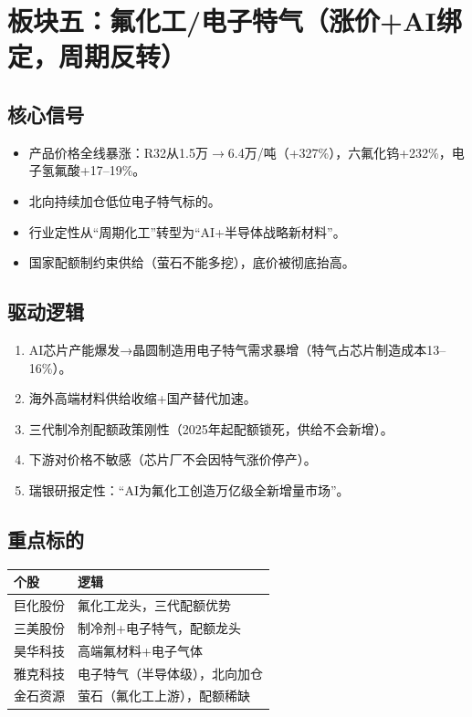 \documentclass[a4paper,11pt,fontset=none]{ctexart}
\begin{document}
\section{板块五：氟化工/电子特气（涨价+AI绑定，周期反转）}

\subsection*{核心信号}
\begin{itemize}
  \item 产品价格全线暴涨：R32从1.5万$\to$6.4万/吨（+327\%），六氟化钨+232\%，电子氢氟酸+17--19\%。
  \item 北向持续加仓低位电子特气标的。
  \item 行业定性从``周期化工''转型为``AI+半导体战略新材料''。
  \item 国家配额制约束供给（萤石不能多挖），底价被彻底抬高。
\end{itemize}

\subsection*{驱动逻辑}
\begin{enumerate}
  \item AI芯片产能爆发→晶圆制造用电子特气需求暴增（特气占芯片制造成本13--16\%）。
  \item 海外高端材料供给收缩+国产替代加速。
  \item 三代制冷剂配额政策刚性（2025年起配额锁死，供给不会新增）。
  \item 下游对价格不敏感（芯片厂不会因特气涨价停产）。
  \item 瑞银研报定性：``AI为氟化工创造万亿级全新增量市场''。
\end{enumerate}

\subsection*{重点标的}
\begin{tabularx}{\textwidth}{L{3cm}X}
\toprule
\textbf{个股} & \textbf{逻辑} \\
\midrule
巨化股份 & 氟化工龙头，三代配额优势 \\
三美股份 & 制冷剂+电子特气，配额龙头 \\
昊华科技 & 高端氟材料+电子气体 \\
雅克科技 & 电子特气（半导体级），北向加仓 \\
金石资源 & 萤石（氟化工上游），配额稀缺 \\
\bottomrule
\end{tabularx}
\end{document}
